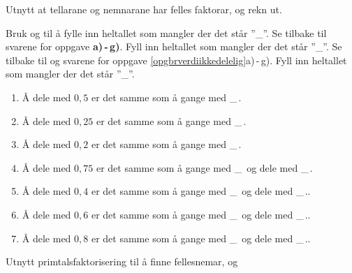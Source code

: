 Utnytt at tellarane og nemnarane har felles faktorar, og rekn ut. \os
{}

\nes
\newpage

Bruk  og  til å fylle inn heltallet som mangler der det står ''\_''.
Se tilbake til svarene for oppgave \textbf{a)\,-\,g)}. Fyll inn heltallet som mangler der det står ''\_''.
\newpage
{}
Se tilbake til  og svarene for oppgave \ref{opgbrverdiikkedelelig}a)\,-\,g).
Fyll inn heltallet som mangler der det står ''\_''.
{\renewcommand{\labelenumi}{(\alph{enumi})}
	\begin{enumerate}
		\item Å dele med $ 0,5 $ er det samme som å gange med \_\,.
		\item Å dele med $ 0,25 $ er det samme som å gange med \_\,.
		\item Å dele med $ 0,2 $ er det samme som å gange med \_\,.
		\item Å dele med $ 0,75 $ er det samme som å gange med \_\, og dele med \_\,.
		\item Å dele med $ 0,4 $ er det samme som å gange med \_\, og dele med \_\,..
		\item Å dele med $ 0,6 $ er det samme som å gange med \_\, og dele med \_\,..
		\item Å dele med $ 0,8 $ er det samme som å gange med \_\, og dele med \_\,..	
\end{enumerate} }

Utnytt primtalsfaktorisering til å finne fellesnemar, og \rknut\os
{}
\newpage



